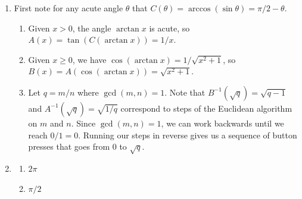 \begin{enumerate}
$\csc^{-1}$ has domain $(-\infty,-1]\cup [1,+\infty)$ and range $[-\pi/2,0)\cup (0,\pi/2]$;\par
$\cot^{-1}$ has domain $\mathbb{R}$ and range $(0,\pi)$
\item First note for any acute angle $\theta$ that $C(\theta) = \arccos(\sin\theta) = \pi/2 - \theta$.
\begin{enumerate}
\item Given $x > 0$, the angle $\arctan x$ is acute, so $A(x) = \tan(C(\arctan x)) = 1/x$.
\item Given $x\geq 0$, we have $\cos(\arctan x) = 1/\sqrt{x^2 + 1}$, so $B(x) = A(\cos(\arctan x)) = \sqrt{x^2 + 1}$.
\item Let $q = m/n$ where $\gcd(m,n) = 1$. Note that $B^{-1}(\sqrt{q}) = \sqrt{q - 1}$ and $A^{-1}(\sqrt{q}) = \sqrt{1/q}$ correspond to steps of the Euclidean algorithm on $m$ and $n$. Since $\gcd(m,n) = 1$, we can work backwards until we reach $0/1 = 0$. Running our steps in reverse gives us a sequence of button presses that goes from $0$ to $\sqrt{q}$.
\end{enumerate}
\item \begin{enumerate}
\item $2\pi$
\item $\pi/2$
\end{enumerate}
\end{enumerate}